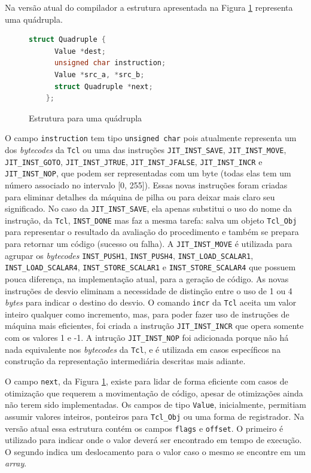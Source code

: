 Na versão atual do compilador a estrutura apresentada na Figura
\ref{quad-struct} representa uma quádrupla.

\begin{figure}[h]
  \centering
  \begin{lstlisting}[language=C]
    struct Quadruple {
      Value *dest;
      unsigned char instruction;
      Value *src_a, *src_b;
      struct Quadruple *next;
    };
  \end{lstlisting}
  \caption{Estrutura para uma quádrupla\label{quad-struct}}
\end{figure}

O campo \verb!instruction! tem tipo \verb!unsigned char! pois atualmente
representa um dos \textit{bytecodes} da \texttt{Tcl} ou uma das
instruções \verb!JIT_INST_SAVE!, \verb!JIT_INST_MOVE!, %
\verb!JIT_INST_GOTO!, \verb!JIT_INST_JTRUE!, \verb!JIT_INST_JFALSE!,
\verb!JIT_INST_INCR! e \verb!JIT_INST_NOP!,
que podem ser representadas com um
byte (todas elas tem um número associado no intervalo [0, 255]). Essas
novas instruções foram criadas para eliminar detalhes da máquina de
pilha ou para deixar mais claro seu significado. No caso da
\verb!JIT_INST_SAVE!, ela apenas substitui o uso do nome da instrução, da
\texttt{Tcl}, \verb!INST_DONE! mas faz a mesma tarefa:
salva um objeto \verb!Tcl_Obj! para representar o resultado da
avaliação do procedimento e também se prepara para retornar um código
(sucesso ou falha). A \verb!JIT_INST_MOVE! é utilizada para agrupar os
\textit{bytecodes} \verb!INST_PUSH1!, \verb!INST_PUSH4!,
\verb!INST_LOAD_SCALAR1!, \verb!INST_LOAD_SCALAR4!,
\verb!INST_STORE_SCALAR1! e \verb!INST_STORE_SCALAR4! que possuem
pouca diferença, na implementação atual, para a geração de código.
As novas instruções de desvio eliminam a
necessidade de distinção entre o uso de 1 ou 4 \textit{bytes} para
indicar o destino do desvio. O comando \verb!incr! da \texttt{Tcl}
aceita um valor inteiro qualquer como incremento, mas, para poder fazer uso
de instruções de máquina mais eficientes, foi criada a instrução
\verb!JIT_INST_INCR! que opera somente com os valores 1 e -1.
A intrução \verb!JIT_INST_NOP! foi adicionada
porque não há nada equivalente nos \textit{bytecodes} da \texttt{Tcl},
e é utilizada em casos específicos na construção da representação
intermediária descritas mais adiante.

O campo \verb!next!, da Figura \ref{quad-struct}, existe para
lidar de forma eficiente com casos de otimização que requerem a
movimentação de código, apesar de otimizações ainda não terem sido
implementadas. Os campos de tipo \verb!Value!,
inicialmente, permitiam assumir valores inteiros, ponteiros para
\verb!Tcl_Obj! ou uma forma de registrador. Na versão atual essa
estrutura contém os campos \verb!flags! e \verb!offset!. O
primeiro é utilizado para indicar onde o valor deverá
ser encontrado em tempo de execução. O segundo indica um deslocamento
para o valor caso o mesmo se encontre em um \textit{array}.

